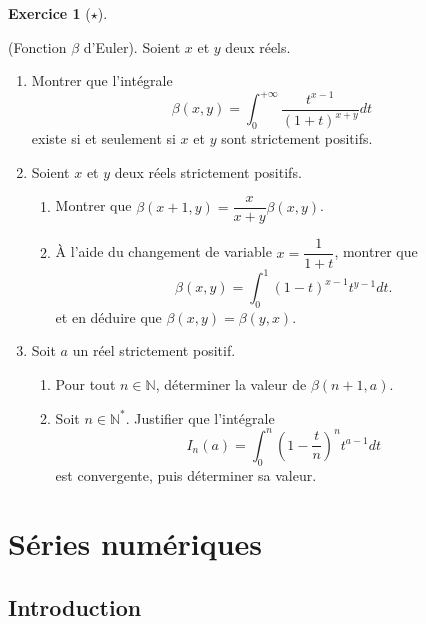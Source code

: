 \documentclass[
  french,
  letterpaper,
  DIV=11,
  numbers=noendperiod]{scrreprt}
\theoremstyle{plain}
\theoremstyle{definition}
\theoremstyle{plain}
\theoremstyle{plain}
\theoremstyle{definition}
\newtheorem{exercise}{Exercice}[chapter]
\theoremstyle{definition}
\theoremstyle{plain}
\theoremstyle{remark}
\begin{document}
\begin{exercise}[\(\star\)]\protect\hypertarget{exr-01-beta}{}\label{exr-01-beta}

(Fonction \(\beta\) d'Euler). Soient \(x\) et \(y\) deux réels.

\begin{enumerate}
\def\labelenumi{\arabic{enumi}.}
\item
  Montrer que l'intégrale
  \[\beta(x,y)=\int_0^{+\infty}\frac{t^{x-1}}{(1+t)^{x+y}}dt\] existe si
  et seulement si \(x\) et \(y\) sont strictement positifs.
\item
  Soient \(x\) et \(y\) deux réels strictement positifs.

  \begin{enumerate}
  \def\labelenumii{\alph{enumii}.}
  \item
    Montrer que \(\beta(x+1,y)=\dfrac{x}{x+y}\beta(x,y)\).
  \item
    À l'aide du changement de variable \(x = \dfrac{1}{1+t}\), montrer
    que \[\beta(x,y)=\int_0^1(1-t)^{x-1}t^{y-1}dt.\] et en déduire que
    \(\beta(x,y)=\beta(y,x)\).
  \end{enumerate}
\item
  Soit \(a\) un réel strictement positif.

  \begin{enumerate}
  \def\labelenumii{\alph{enumii}.}
  \item
    Pour tout \(n\in\mathbb{N}\), déterminer la valeur de
    \(\beta(n+1,a)\).
  \item
    Soit \(n\in\mathbb{N}^*\). Justifier que l'intégrale
    \[I_n(a)=\int_0^n\left(1-\frac{t}{n}\right)^nt^{a-1}dt\] est
    convergente, puis déterminer sa valeur.
  \end{enumerate}
\end{enumerate}

\end{exercise}


\chapter{Séries numériques}\label{suxe9ries-numuxe9riques}

\section*{Introduction}\label{introduction-1}
\end{document}

